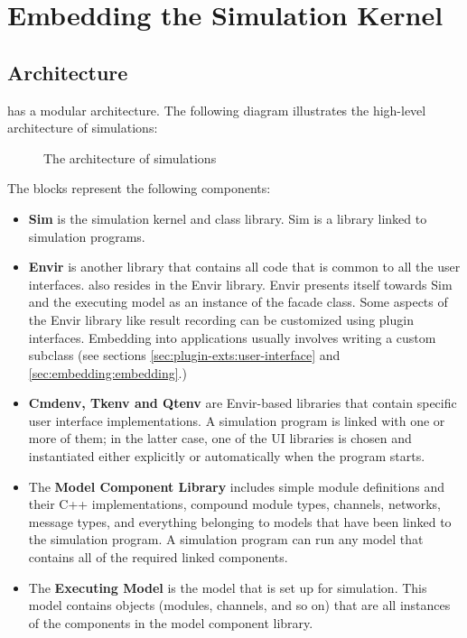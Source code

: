 \chapter{Embedding the Simulation Kernel}
\label{cha:embedding}

\section{Architecture}
\label{sec:embedding:architecture}

{\opp} has a modular architecture. The following diagram illustrates the
high-level architecture of {\opp} simulations:

\begin{figure}[htbp]
  \begin{center}
    
    \caption{The architecture of {\opp} simulations}
  \end{center}
\end{figure}

The blocks represent the following components:

\begin{itemize}
  \item{\textbf{Sim} is the simulation kernel and class
    library. Sim is a library linked to
    simulation programs.}
  \item{\textbf{Envir} is another library that contains all code
    that is common to all the user interfaces.  also resides
    in the Envir library. Envir presents itself towards Sim and the executing model
    as an instance of the  facade class. Some aspects of the
    Envir library like result recording can be customized
    using plugin interfaces. Embedding {\opp} into applications
    usually involves writing a custom  subclass (see sections
    \ref{sec:plugin-exts:user-interface} and \ref{sec:embedding:embedding}.)}
  \item{\textbf{Cmdenv, Tkenv and Qtenv} are Envir-based libraries that contain
    specific user interface implementations. A simulation program
    is linked with one or more of them; in the latter case, one of the UI libraries
    is chosen and instantiated either explicitly or automatically when the program starts.}
  \item{The \textbf{Model Component Library} includes simple module definitions and
    their C++ implementations, compound module types, channels, networks,
    message types, and everything belonging to models that
    have been linked to the simulation program. A simulation program can
    run any model that contains all of the required linked components.}
  \item{The \textbf{Executing Model} is the model that is set up
    for simulation. This model contains objects (modules, channels, and so on) that
    are all instances of the components in the model component library.}
\end{itemize}

